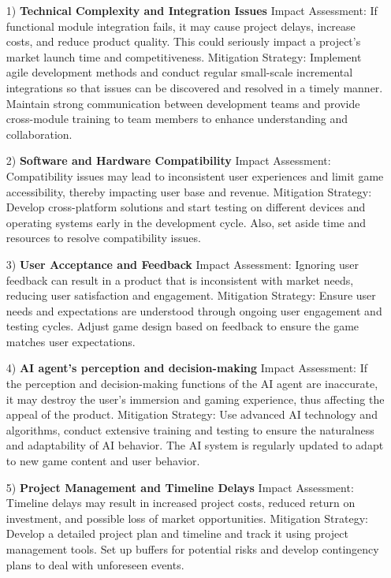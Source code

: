 \begin{itemize}
    \item [1)] 
    \textbf{Technical Complexity and Integration Issues} 
    Impact Assessment: If functional module integration fails, it may cause project delays, increase costs, and reduce product quality. This could seriously impact a project's market launch time and competitiveness.
    Mitigation Strategy: Implement agile development methods and conduct regular small-scale incremental integrations so that issues can be discovered and resolved in a timely manner. Maintain strong communication between development teams and provide cross-module training to team members to enhance understanding and collaboration.
    \item [2)]
    \textbf{Software and Hardware Compatibility} 
    Impact Assessment: Compatibility issues may lead to inconsistent user experiences and limit game accessibility, thereby impacting user base and revenue.
    Mitigation Strategy: Develop cross-platform solutions and start testing on different devices and operating systems early in the development cycle. Also, set aside time and resources to resolve compatibility issues.
    \item [3)]
    \textbf{User Acceptance and Feedback} 
    Impact Assessment: Ignoring user feedback can result in a product that is inconsistent with market needs, reducing user satisfaction and engagement.
    Mitigation Strategy: Ensure user needs and expectations are understood through ongoing user engagement and testing cycles. Adjust game design based on feedback to ensure the game matches user expectations.
    \item [4)]
    \textbf{AI agent’s perception and decision-making} 
    Impact Assessment: If the perception and decision-making functions of the AI agent are inaccurate, it may destroy the user's immersion and gaming experience, thus affecting the appeal of the product.
    Mitigation Strategy: Use advanced AI technology and algorithms, conduct extensive training and testing to ensure the naturalness and adaptability of AI behavior. The AI system is regularly updated to adapt to new game content and user behavior.
    \item [5)]
    \textbf{Project Management and Timeline Delays} 
    Impact Assessment: Timeline delays may result in increased project costs, reduced return on investment, and possible loss of market opportunities.
    Mitigation Strategy: Develop a detailed project plan and timeline and track it using project management tools. Set up buffers for potential risks and develop contingency plans to deal with unforeseen events.

\end{itemize}
